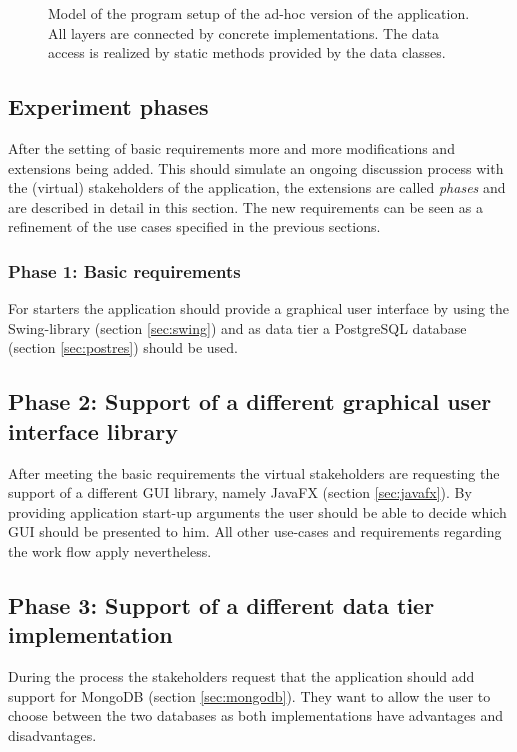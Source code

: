 \begin{figure}
	\label{fig:adhoc-model}
	\caption{Model of the program setup of the ad-hoc version of the application. All layers are connected by concrete implementations. The data access is realized by static methods provided by the data classes.}
\end{figure}

\subsection{Experiment phases}
After the setting of basic requirements more and more modifications and extensions being added. This should simulate an ongoing discussion process with the (virtual) stakeholders of the application, the extensions are called \emph{phases} and are described in detail in this section. The new requirements can be seen as a refinement of the use cases specified in the previous sections.

\subsubsection{Phase 1: Basic requirements} 
For starters the application should provide a graphical user interface by using the Swing-library (section \ref{sec:swing}) and as data tier a PostgreSQL database (section \ref{sec:postres}) should be used.

\subsection{Phase 2: Support of a different graphical user interface library}
After meeting the basic requirements the virtual stakeholders are requesting the support of a different GUI library, namely JavaFX (section \ref{sec:javafx}). By providing application start-up arguments the user should be able to decide which GUI should be presented to him. All other use-cases and requirements regarding the work flow apply nevertheless.

\subsection{Phase 3: Support of a different data tier implementation}
During the process the stakeholders request that the application should add support for MongoDB (section \ref{sec:mongodb}). They want to allow the user to choose between the two databases as both implementations have advantages and disadvantages. 

